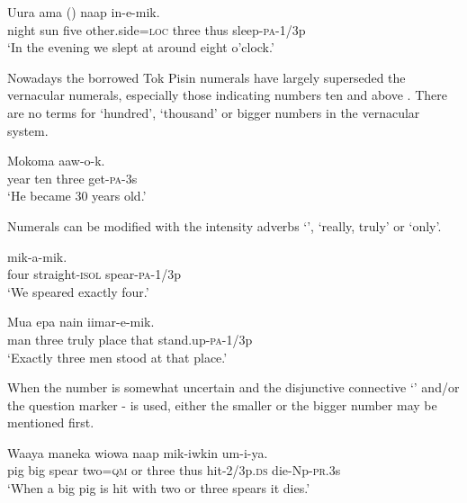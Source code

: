 \ea%
\label{ex:3:x90}
\gll Uura ama  ()  naap in-e-mik. \\
night sun five other.side=\textsc{loc} three thus sleep-\textsc{pa}-1/3p\\
\glt`In the evening we slept at around eight o'clock.'
\z

Nowadays the borrowed Tok Pisin numerals have largely superseded the vernacular numerals, especially those indicating numbers ten and above . There are no terms for `hundred', `thousand' or bigger numbers in the vernacular system.

\ea%
\label{ex:3:x91}
\gll Mokoma   aaw-o-k. \\
year ten three get-\textsc{pa}-3s\\
\glt`He became 30 years old.'
\z

Numerals can be modified with the intensity adverbs  `',  `really, truly' or  `only'.

\ea%
\label{ex:3:x443}
\gll {}  mik-a-mik. \\
four straight-\textsc{isol} spear-\textsc{pa}-1/3p\\
\glt`We speared exactly four.'
\z

\ea%
\label{ex:3:x661}
\gll Mua   epa nain iimar-e-mik. \\
man three truly place that stand.up-\textsc{pa}-1/3p\\
\glt`Exactly three men stood at that place.'
\z

When the number is somewhat uncertain and the disjunctive connective  `' and/or the question marker - is used, either the smaller or the bigger number may be mentioned first.

\ea%
\label{ex:3:x1416}
\gll Waaya maneka wiowa    naap mik-iwkin um-i-ya.\\
pig big spear two=\textsc{qm} or three thus hit-2/3p.\textsc{ds} die-Np-\textsc{pr}.3s\\
\glt`When a big pig is hit with two or three spears it dies.'
\z


